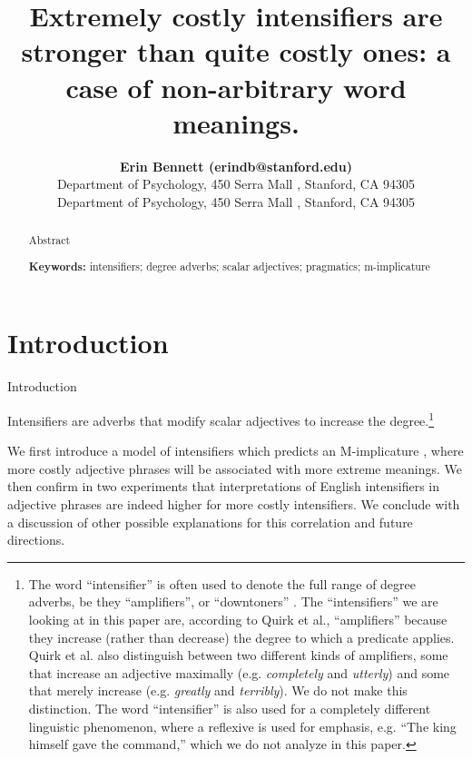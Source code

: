 \documentclass[10pt,letterpaper]{article}
\title{Extremely costly intensifiers are stronger than quite costly ones: a case of non-arbitrary word meanings.}
\author{{\large \bf Erin Bennett (erindb@stanford.edu)} \\
  Department of Psychology, 450 Serra Mall , Stanford, CA 94305
  \AND {\large \bf Noah Goodman (ngoodman@stanford.edu)} \\
  Department of Psychology, 450 Serra Mall , Stanford, CA 94305}
\newcommand{\w}[1]{\emph{#1}}
\begin{document}
\maketitle

\begin{abstract}

Abstract

\textbf{Keywords:} 
intensifiers; degree adverbs; scalar adjectives; pragmatics; m-implicature
\end{abstract}

\section{Introduction}

Introduction


Intensifiers are adverbs that modify scalar adjectives to increase the degree.\footnote{The word ``intensifier'' is often used to denote the full range of degree adverbs, be they ``amplifiers'', or ``downtoners'' \cite{quirk}. The ``intensifiers'' we are looking at in this paper are, according to Quirk et al.,  ``amplifiers'' because they increase (rather than decrease) the degree to which a predicate applies. Quirk et al. also distinguish between two different kinds of amplifiers, some that increase an adjective maximally (e.g. \w{completely} and \w{utterly}) and some that merely increase (e.g. \w{greatly} and \w{terribly}). We do not make this distinction. The word ``intensifier'' is also used for a completely different linguistic phenomenon, where a reflexive is used for emphasis, e.g. ``The king himself gave the command,'' which we do not analyze in this paper.}

We first introduce a model of intensifiers which predicts an M-implicature \cite{levinson}, where more costly adjective phrases will be associated with more extreme meanings. We then confirm in two experiments that interpretations of English intensifiers in adjective phrases are indeed higher for more costly intensifiers. We conclude with a discussion of other possible explanations for this correlation and future directions.


\end{document}
